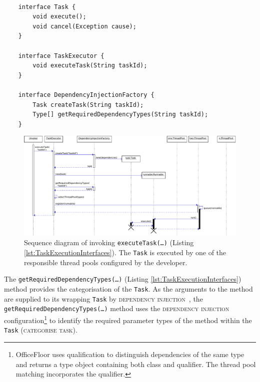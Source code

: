 \documentclass[prodmode]{style/acmlarge}
\begin{document}
\begin{lstlisting}[float,label=lst:TaskExecutionInterfaces]

    interface Task {
        void execute(); 
        void cancel(Exception cause);
    }

    interface TaskExecutor {
        void executeTask(String taskId);
    }

    interface DependencyInjectionFactory {
        Task createTask(String taskId);
        Type[] getRequiredDependencyTypes(String taskId);
    }
\end{lstlisting}


\begin{figure}[!t]
\centering
\includegraphics[width=6in]{ExecuteComponentSequenceDiagram}
\caption{Sequence diagram of invoking \texttt{executeTask(\ldots)} (Listing \ref{lst:TaskExecutionInterfaces}).  The \texttt{Task} is executed by one of the responsible thread pools configured by the developer.}
\label{fig:ExecuteComponentSequenceDiagram}
\end{figure}

The \texttt{getRequiredDependencyTypes(\ldots)} (Listing
\ref{lst:TaskExecutionInterfaces}) method provides the categorisation of the
\texttt{Task}.  As the arguments to the method are supplied to its wrapping
\texttt{Task} by \textsc{dependency injection}~\cite{ioc}, the
\texttt{getRequiredDependencyTypes(\ldots)} method uses the \textsc{dependency
injection} configuration\footnote{OfficeFloor uses qualification to distinguish
dependencies of the same type and returns a type object containing both class
and qualifier.  The thread pool matching incorporates the qualifier.} to
identify the required parameter types of the method within the \texttt{Task}
(\textsc{categorise task}).
\end{document}
